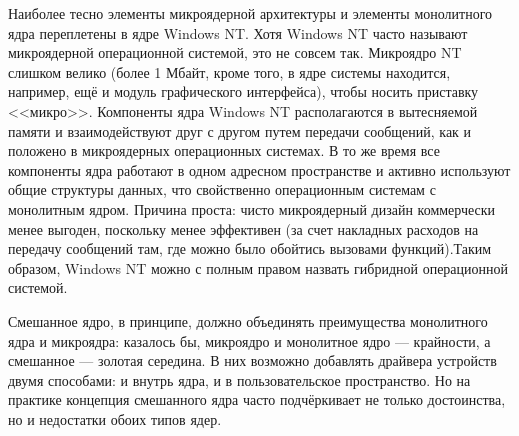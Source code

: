 Наиболее тесно элементы микроядерной архитектуры и элементы монолитного ядра переплетены в ядре Windows NT. Хотя Windows NT часто называют микроядерной операционной системой, это не совсем так. 
Микроядро NT слишком велико (более 1 Мбайт, кроме того, в ядре системы находится, например, ещё и модуль графического интерфейса), чтобы носить приставку <<микро>>. Компоненты ядра Windows NT располагаются в вытесняемой памяти и взаимодействуют друг с другом путем передачи сообщений, как и положено в микроядерных операционных системах.
В то же время все компоненты ядра работают в одном адресном пространстве и активно используют общие структуры данных, что свойственно операционным системам с монолитным ядром. Причина проста: чисто микроядерный дизайн коммерчески менее выгоден, поскольку менее эффективен (за счет накладных расходов на передачу сообщений там, где можно было обойтись вызовами функций).Таким образом, Windows NT можно с полным правом назвать гибридной операционной системой.

Смешанное ядро, в принципе, должно объединять преимущества монолитного ядра и микроядра: казалось бы, микроядро и монолитное ядро --- крайности, а смешанное --- золотая середина. В них возможно добавлять драйвера устройств двумя способами: и внутрь ядра, и в пользовательское пространство. Но на практике концепция смешанного ядра часто подчёркивает не только достоинства, но и недостатки обоих типов ядер.

